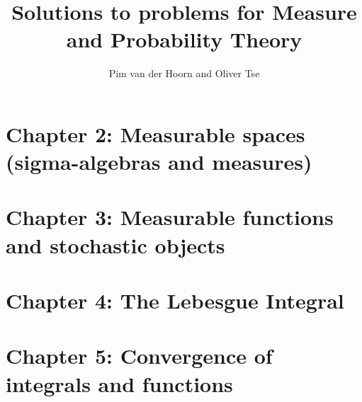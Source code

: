 \documentclass{lecturenotes}
\begin{document}
\begin{titlepage}
    \title{Solutions to problems for Measure and Probability Theory}
    \author{Pim van der Hoorn and Oliver Tse}
    \maketitle
\end{titlepage}



\section*{Chapter 2: Measurable spaces (sigma-algebras and measures)}



\section*{Chapter 3: Measurable functions and stochastic objects}



\section*{Chapter 4: The Lebesgue Integral}


\section*{Chapter 5: Convergence of integrals and functions}
\end{document}
